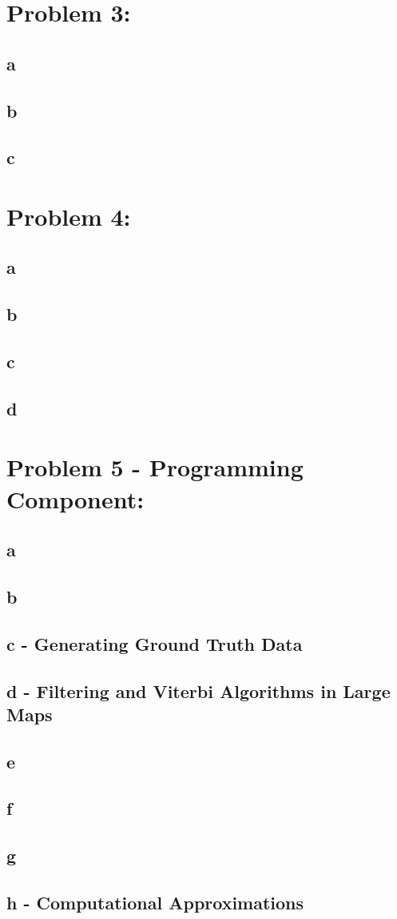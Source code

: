 \documentclass[11pt, oneside]{article}   	%
\begin{document}
\begin{flushleft}
\section*{Problem 3:}
\subsection*{a}
\subsection*{b}
\subsection*{c}
\section*{Problem 4:}
\subsection*{a}

\subsection*{b}
\subsection*{c}
\subsection*{d}
\section*{Problem 5 - Programming Component:}
\subsection*{a}
\subsection*{b}
\subsection*{c - Generating Ground Truth Data}
\subsection*{d - Filtering and Viterbi Algorithms in Large Maps}
\subsection*{e}
\subsection*{f}
\subsection*{g}
\subsection*{h - Computational Approximations}
\end{flushleft}
\end{document}
